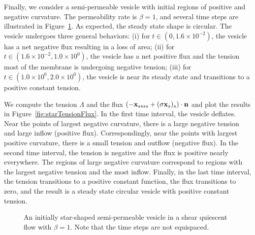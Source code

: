 \documentclass[aps,prl,showpacs]{revtex4}
\newif\ifTikz
\begin{document}
Finally, we consider a semi-permeable vesicle with initial regions of
positive and negative curvature. The permeability rate is $\beta=1$, and
several time steps are illustrated in Figure~\ref{fig:starShape}. As
expected, the steady state shape is circular. The vesicle undergoes
three general behaviors: (i) for $t \in (0,1.6 \times 10^{-2})$, the
vesicle has a net negative flux resulting in a loss of area; (ii) for $t
\in (1.6 \times 10^{-2},1.0 \times 10^{0})$, the vesicle has a net
positive flux and the tension most of the membrane is undergoing
negative tension; (iii) for $t \in (1.0 \times 10^{0},2.0 \times
10^{0})$, the vesicle is near its steady state and transitions to a
positive constant tension.

We compute the tension $\Lambda$ and the flux $(-\mathbf{x}_{ssss} + (\sigma
\mathbf{x}_s)_s) \cdot \mathbf{n}$ and plot the results in
Figure~\ref{fig:starTensionFlux}.  In the first time interval, the
vesicle deflates. Near the points of largest negative curvature, there
is a large negative tension and large inflow (positive flux).
Correspondingly, near the points with largest positive curvature, there
is a small tension and outflow (negative flux). In the second time
interval, the tension is negative and the flux is positive nearly
everywhere. The regions of large negative curvature correspond to
regions with the largest negative tension and the most inflow. Finally,
in the last time interval, the tension transitions to a positive
constant function, the flux transitions to zero, and the result is a
steady state circular vesicle with positive constant tension.

\begin{figure}[htp]
    \ifTikz
    
    \quad
    
    \quad
    
    \quad
    
    \quad
    
    \fi
  \caption{\label{fig:starShape} An initially star-shaped semi-permeable
  vesicle in a shear quiescent flow with $\beta=1$. Note that the time
  steps are not equispaced.}
\end{figure}
\end{document}
